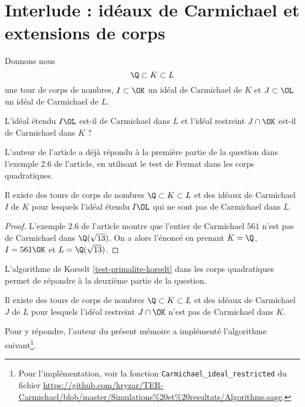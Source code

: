 \section{Interlude : idéaux de Carmichael et extensions de corps}

Donnons nous \[\Q\subset K \subset L\] une tour de corps de nombres, $I\subset \OK$ un idéal de Carmichael de $K$ et $J \subset \OL$ un idéal de Carmichael de $L$. 

\begin{question}
	L'idéal étendu $I\OL$ est-il de Carmichael dans $L$ et l'idéal restreint $J\cap\OK$ est-il de Carmichael dans $K$ ? 
\end{question}

L'auteur de l'article a déjà répondu à la première partie de la question dans l'exemple 2.6 de l'article, en utilisant le test de Fermat dans les corps quadratiques.

\begin{proposition}\label{premier-ce}
	Il existe des tours de corps de nombres $\Q\subset K \subset L$ et des idéaux de Carmichael $I$ de $K$ pour lesquels l'idéal étendu $I\OL$ qui ne sont pas de Carmichael dans $L$.
\end{proposition}

\begin{proof}
	L'exemple 2.6 de l'article montre que l'entier de Carmichael $561$ n'est pas de Carmichael dans $\Q(\sqrt{13})$. On a alors l'énoncé en prenant $K = \Q$, $I = 561\OK$ et $L = \Q(\sqrt{13})$.
\end{proof}

L'algorithme de Korselt \ref{test-primalite-korselt} dans les corps quadratiques permet de répondre à la deuxième partie de la question. 

\begin{proposition}\label{deuxieme-ce}
	Il existe des tours de corps de nombres $\Q\subset K \subset L$ et des idéaux de Carmichael $J$ de $L$ pour lesquels l'idéal restreint $J\cap \OK$ n'est pas de Carmichael dans $K$.
\end{proposition}

Pour y répondre, l'auteur du présent mémoire a implémenté l'algorithme suivant\footnote{Pour l'implémentation, voir la fonction \texttt{Carmichael\_ideal\_restricted} du fichier \url{https://github.com/kryzar/TER-Carmichael/blob/master/Simulations\%20et\%20resultats/Algorithms.sage}.}.

